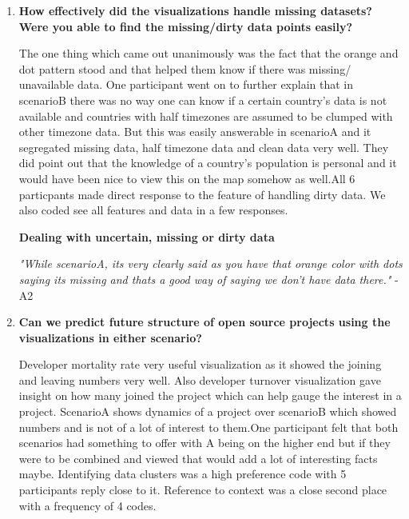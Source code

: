 \documentclass[seploa]{beavtex}
\begin{document}
\begin{enumerate}
{\em "Ah! Confusion no. I felt like the scenarioA, the visualization was a lot more intuitive, the use of colors also helped a lot."} - A4

{\em "I felt like scenarioA was a lot more interactive like you could see little labels popup or something like that so I feel like that gives you a lot more information than just the visualization itself."} - A2

\item \textbf{How effectively did the visualizations handle missing datasets? Were you able to find the missing/dirty data points easily?}

The one thing which came out unanimously was the fact that the orange and dot pattern stood and that helped them know if there was missing/ unavailable data. One participant went on to further explain that in scenarioB there was no way one can know if a certain country's data is not available and countries with half timezones are assumed to be clumped with other timezone data. But this was easily answerable in scenarioA and it segregated missing data, half timezone data and clean data very well. They did point out that the knowledge of a country's population is personal and it would have been nice to view this on the map somehow as well.All 6 particpants made direct response to the feature of handling dirty data. We also coded see all features and data in a few responses.

\textbf{Dealing with uncertain, missing or dirty data}

{\em "While scenarioA, its very clearly said as you have that orange color with dots saying its missing and thats a good way of saying we don't have data there."} - A2

\item \textbf{Can we predict future structure of open source projects using the visualizations in either scenario?}

Developer mortality rate very useful visualization as it showed the joining and leaving numbers very well. Also developer turnover visualization gave insight on how many joined the project which can help gauge the interest in a project. ScenarioA shows dynamics of a project over scenarioB which showed numbers and is not of a lot of interest to them.One participant felt that both scenarios had something to offer with A being on the higher end but if they were to be combined and viewed that would add a lot of interesting facts maybe. Identifying data clusters was a high preference code with 5 participants reply close to it. Reference to context was a close second place with a frequency of 4 codes.


\end{enumerate}
\end{document}
